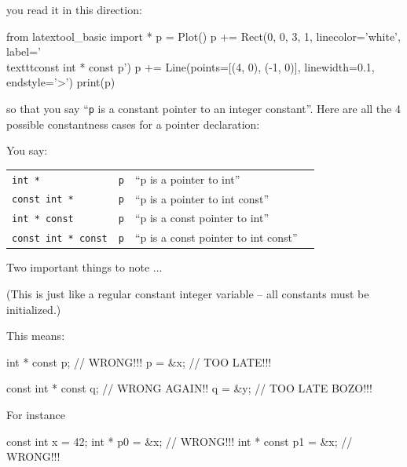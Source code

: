
you read it in this direction:
\begin{python}
from latextool_basic import *
p = Plot()
p += Rect(0, 0, 3, 1, linecolor='white', label='\\texttt{const int * const p}')
p += Line(points=[(4, 0), (-1, 0)], linewidth=0.1, endstyle='>')
print(p)
\end{python}    
so that you say ``\texttt{p} is a constant pointer to an integer constant''. Here are all the 4 possible constantness cases for a pointer declaration:

You say:




\begin{tabular}{l l l l}
    \texttt{int *} & \texttt{p} &  ``p is a pointer to int'' \\
    \texttt{const int *} & \texttt{p} &  ``p is a pointer to int const''\\
    \texttt{int * const} & \texttt{p} &  ``p is a const pointer to int'' \\
    \texttt{const int * const} & \texttt{p} &  ``p is a const pointer to int const''\\
\end{tabular}


Two important things to note ...

 (This is just like a regular constant integer variable -- all constants must be initialized.)

This means:

\begin{consolethree}[escapeinside=||]
int * const p;          // WRONG!!!
p = &x;                 // TOO LATE!!!

const int * const q;    // WRONG AGAIN!!
q = &y;                 // TOO LATE BOZO!!!
\end{consolethree}
 For instance

\begin{consolethree}[escapeinside=||]
const int x = 42;
int * p0 = &x;       // WRONG!!!
int * const p1 = &x; // WRONG!!! 
\end{consolethree}


